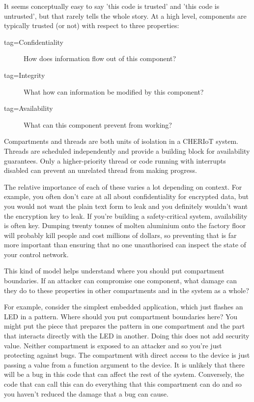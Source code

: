 It seems conceptually easy to say 'this code is trusted' and 'this code is untrusted', but that rarely tells the whole story.
At a high level, components are typically trusted (or not) with respect to three properties:

\begin{description}
	\item[tag=Confidentiality]{How does information flow out of this component?}
	\item[tag=Integrity]{What how can information be modified by this component?}
	\item[tag=Availability]{What can this component prevent from working?}
\end{description}

\begin{note}
Compartments and threads are both units of isolation in a CHERIoT system.
Threads are scheduled independently and provide a building block for availability guarantees.
Only a higher-priority thread or code running with interrupts disabled can prevent an unrelated thread from making progress.
\end{note}

The relative importance of each of these varies a lot depending on context.
For example, you often don't care at all about confidentiality for encrypted data, but you would not want the plain text form to leak and you definitely wouldn't want the encryption key to leak.
If you're building a safety-critical system, availability is often key.
Dumping twenty tonnes of molten aluminium onto the factory floor will probably kill people and cost millions of dollars, so preventing that is far more important than ensuring that no one unauthorised can inspect the state of your control network.

This kind of model helps understand where you should put compartment boundaries.
If an attacker can compromise one component, what damage can they do to these properties in other compartments and in the system as a whole?

For example, consider the simplest embedded application, which just flashes an LED in a pattern.
Where should you put compartment boundaries here?
You might put the piece that prepares the pattern in one compartment and the part that interacts directly with the LED in another.
Doing this does not add security value.
Neither compartment is exposed to an attacker and so you're just protecting against bugs.
The compartment with direct access to the device is just passing a value from a function argument to the device.
It is unlikely that there will be a bug in this code that can affect the rest of the system.
Conversely, the code that can call this can do everything that this compartment can do and so you haven't reduced the damage that a bug can cause.

